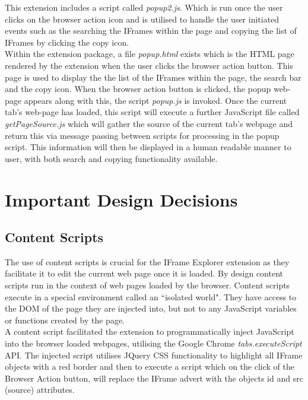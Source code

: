 \documentclass[12pt]{article}
\begin{document}
This extension includes a script called \textit{popup2.js}. Which is run once the user clicks on the browser action icon and is utilised to handle the user initiated events such as the searching the IFrames within the page and copying the list of IFrames by clicking the copy icon. \\

Within the extension package, a file \textit{popup.html} exists which is the HTML page rendered by the extension when the user clicks the browser action button. This page is used to display the the list of the IFrames within the page, the search bar and the copy icon. When the browser action button is clicked, the popup web-page appears along with this, the script \textit{popup.js} is invoked. Once the current tab's web-page has loaded, this script will execute a further JavaScript file called \textit{getPageSource.js} which will gather the source of the current tab's webpage and return this via message passing between scripts for processing in the popup script. This information will then be displayed in a human readable manner to user, with both search and copying functionality available.

\pagebreak

\section{Important Design Decisions}

\subsection{Content Scripts} \label{Content_Scripts}
The use of content scripts is crucial for the IFrame Explorer extension as they facilitate it to edit the current web page once it is loaded. By design content scripts run in the context of web pages loaded by the browser. Content scripts execute in a special environment called an ``isolated world". They have access to the DOM of the page they are injected into, but not to any JavaScript variables or functions created by the page. \\ 

A content script facilitated the extension to programmatically inject JavaScript into the browser loaded webpages, utilising the Google Chrome \textit{tabs.executeScript} API. The injected script utilises JQuery CSS functionality to highlight all IFrame objects with a red border and then to execute a script which on the click of the Browser Action button, will replace the IFrame advert with the objects id and src (source) attributes.  \\
\end{document}
